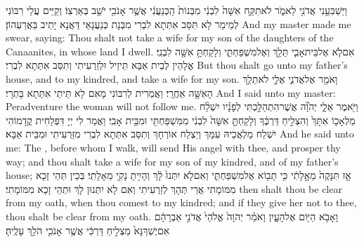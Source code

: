 {וַיַּשְׁבִּעֵ֥נִי אֲדֹנִ֖י לֵאמֹ֑ר לֹא\maqqaf תִקַּ֤ח אִשָּׁה֙ לִבְנִ֔י מִבְּנוֹת֙ הַֽכְּנַעֲנִ֔י אֲשֶׁ֥ר אָנֹכִ֖י יֹשֵׁ֥ב בְּאַרְצֽוֹ׃}
{וְקַיֵּים עֲלַי רִבּוֹנִי לְמֵימַר לָא תִּסַּב אִתְּתָא לִבְרִי מִבְּנָת כְּנַעֲנָאֵי דַּאֲנָא יָתֵיב בַּאֲרַעְהוֹן׃}
{And my master made me swear, saying: Thou shalt not take a wife for my son of the daughters of the Canaanites, in whose land I dwell.}{}
{אִם\maqqaf לֹ֧א אֶל\maqqaf בֵּית\maqqaf אָבִ֛י תֵּלֵ֖ךְ וְאֶל\maqqaf מִשְׁפַּחְתִּ֑י וְלָקַחְתָּ֥ אִשָּׁ֖ה לִבְנִֽי׃}
{אֱלָהֵין לְבֵית אַבָּא תֵּיזֵיל וּלְזַרְעִיתִי וְתִסַּב אִתְּתָא לִבְרִי׃}
{But thou shalt go unto my father’s house, and to my kindred, and take a wife for my son.}{}
{וָאֹמַ֖ר אֶל\maqqaf אֲדֹנִ֑י אֻלַ֛י לֹא\maqqaf תֵלֵ֥ךְ הָאִשָּׁ֖ה אַחֲרָֽי׃}
{וַאֲמַרִית לְרִבּוֹנִי מָאִם לָא תֵּיתֵי אִתְּתָא בָּתְרָי׃}
{And I said unto my master: Peradventure the woman will not follow me.}{}
{וַיֹּ֖אמֶר אֵלָ֑י יְהֹוָ֞ה אֲשֶׁר\maqqaf הִתְהַלַּ֣כְתִּי לְפָנָ֗יו יִשְׁלַ֨ח מַלְאָכ֤וֹ אִתָּךְ֙ וְהִצְלִ֣יחַ דַּרְכֶּ֔ךָ וְלָקַחְתָּ֤ אִשָּׁה֙ לִבְנִ֔י מִמִּשְׁפַּחְתִּ֖י וּמִבֵּ֥ית אָבִֽי׃}
{וַאֲמַר לִי יְיָ דִּפְלַחִית קֳדָמוֹהִי יִשְׁלַח מַלְאֲכֵיהּ עִמָּךְ וְיַצְלַח אוֹרְחָךְ וְתִסַּב אִתְּתָא לִבְרִי מִזַּרְעִיתִי וּמִבֵּית אַבָּא׃}
{And he said unto me: The \lord, before whom I walk, will send His angel with thee, and prosper thy way; and thou shalt take a wife for my son of my kindred, and of my father’s house;}{}
{אָ֤ז תִּנָּקֶה֙ מֵאָ֣לָתִ֔י כִּ֥י תָב֖וֹא אֶל\maqqaf מִשְׁפַּחְתִּ֑י וְאִם\maqqaf לֹ֤א יִתְּנוּ֙ לָ֔ךְ וְהָיִ֥יתָ נָקִ֖י מֵאָלָתִֽי׃}
{בְּכֵין תְּהֵי זָכָא מִמּוֹמָתִי אֲרֵי תְּהָךְ לְזַרְעִיתִי וְאִם לָא יִתְּנוּן לָךְ וּתְהֵי זָכָא מִמּוֹמָתִי׃}
{then shalt thou be clear from my oath, when thou comest to my kindred; and if they give her not to thee, thou shalt be clear from my oath.}{}
{וָאָבֹ֥א הַיּ֖וֹם אֶל\maqqaf הָעָ֑יִן וָאֹמַ֗ר יְהֹוָה֙ אֱלֹהֵי֙ אֲדֹנִ֣י אַבְרָהָ֔ם אִם\maqqaf יֶשְׁךָ\maqqaf נָּא֙ מַצְלִ֣יחַ דַּרְכִּ֔י אֲשֶׁ֥ר אָנֹכִ֖י הֹלֵ֥ךְ עָלֶֽיהָ׃}
